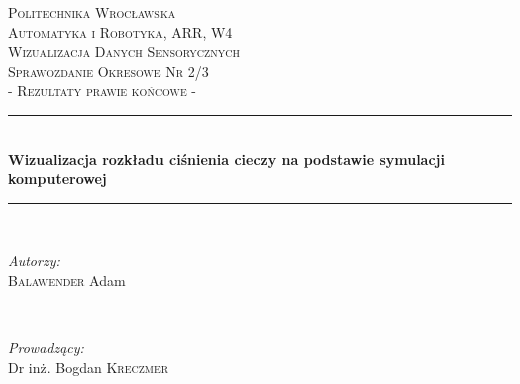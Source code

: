 \begin{titlepage}

\newcommand{\HRule}{\rule{\linewidth}{0.5mm}} %

\center %


\textsc{\LARGE Politechnika Wrocławska\\}
\vspace{0.5cm}
\textsc{\large Automatyka i Robotyka, ARR, W4}\\[4.5cm] %

\textsc{\Large Wizualizacja Danych Sensorycznych}\\[0.5cm] %
\textsc{\large Sprawozdanie Okresowe Nr 2/3 \\ - Rezultaty prawie końcowe -}\\[0.5cm] %


\HRule \\[0.6cm]
{ \huge \bfseries Wizualizacja rozkładu ciśnienia cieczy na podstawie symulacji komputerowej}\\[0.6cm] %
\HRule \\[3.5cm]


\begin{minipage}{0.4\textwidth}
\begin{flushleft} \large
\emph{Autorzy:}\\
\textsc{Balawender} Adam %
\end{flushleft}
\end{minipage}
~
\begin{minipage}{0.4\textwidth}
\begin{flushright} \large
\emph{Prowadzący:} \\
Dr inż. Bogdan \textsc{Kreczmer} %
\end{flushright}
\end{minipage}\\[0.1cm]


\end{titlepage}
